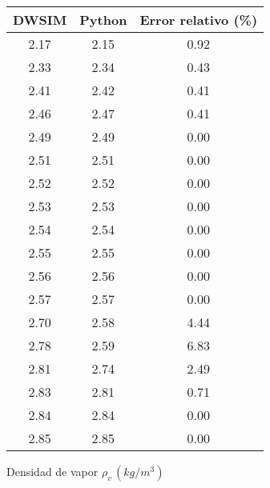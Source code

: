 \begin{figure}[H]
    \centering
    \caption{Densidad de vapor $\rho_v \, (kg/m^3)$}
    \small
    \begin{tabular}{|c|c|c|}
        \hline
        \textbf{DWSIM} & \textbf{Python} & \textbf{Error relativo} (\%) \\
        \hline
        2.17           & 2.15            & 0.92                         \\
        \hline
        2.33           & 2.34            & 0.43                         \\
        \hline
        2.41           & 2.42            & 0.41                         \\
        \hline
        2.46           & 2.47            & 0.41                         \\
        \hline
        2.49           & 2.49            & 0.00                         \\
        \hline
        2.51           & 2.51            & 0.00                         \\
        \hline
        2.52           & 2.52            & 0.00                         \\
        \hline
        2.53           & 2.53            & 0.00                         \\
        \hline
        2.54           & 2.54            & 0.00                         \\
        \hline
        2.55           & 2.55            & 0.00                         \\
        \hline
        2.56           & 2.56            & 0.00                         \\
        \hline
        2.57           & 2.57            & 0.00                         \\
        \hline
        2.70           & 2.58            & 4.44                         \\
        \hline
        2.78           & 2.59            & 6.83                         \\
        \hline
        2.81           & 2.74            & 2.49                         \\
        \hline
        2.83           & 2.81            & 0.71                         \\
        \hline
        2.84           & 2.84            & 0.00                         \\
        \hline
        2.85           & 2.85            & 0.00                         \\

\end{tabular}
\end{figure}

